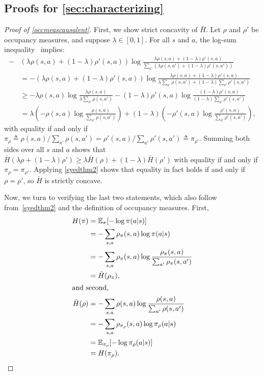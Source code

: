 \documentclass{article}
\newcommand\bbE{\ensuremath{\mathbb{E}}} %
\newcommand{\1}{\mathbb{I}} %
\begin{document}
\subsection{\texorpdfstring{Proofs for \cref{sec:characterizing}}{Proofs for Section 3}} \label{sec:proofs1}
\begin{proof}[Proof of \cref{occmeascausalent}]

First, we show strict concavity of $\bar H$. Let $\rho$ and $\rho'$ be occupancy measures, and suppose $\lambda \in [0,1]$. For all $s$ and $a$, the log-sum inequality~\citep{cover2012elements} implies:
\begin{align}
  - &(\lambda \rho(s,a) + (1-\lambda)\rho'(s,a) )\log \frac{\lambda \rho(s,a) + (1-\lambda)\rho'(s,a) }{\sum_{a'}(\lambda \rho(s,a') + (1-\lambda)\rho'(s,a') )} \\
 &= -(\lambda \rho(s,a) + (1-\lambda)\rho'(s,a) )\log \frac{\lambda \rho(s,a) + (1-\lambda)\rho'(s,a) }{\lambda \sum_{a'}\rho(s,a') + (1-\lambda)\sum_{a'}\rho'(s,a')} \\
 &\geq -\lambda \rho(s,a)\log\frac{\lambda\rho(s,a)}{\lambda\sum_{a'}\rho(s,a')} - (1-\lambda)\rho'(s,a)\log\frac{(1-\lambda)\rho'(s,a)}{(1-\lambda)\sum_{a'}\rho'(s,a')} \\
 &= \lambda \left(-\rho(s,a)\log\frac{\rho(s,a)}{\sum_{a'}\rho(s,a')}\right) + (1-\lambda)\left(-\rho'(s,a)\log\frac{\rho'(s,a)}{\sum_{a'}\rho'(s,a')}\right),
 \end{align}
 with equality if and only if $\pi_\rho \triangleq \rho(s,a)/\sum_{a'}\rho(s,a') = \rho'(s,a)/\sum_{a'}\rho'(s,a') \triangleq \pi_{\rho'}$.
Summing both sides over all $s$ and $a$ shows that $\bar H(\lambda\rho + (1-\lambda)\rho') \geq \lambda \bar H(\rho) + (1-\lambda)\bar H(\rho')$ with equality if and only if $\pi_\rho = \pi_{\rho'}$. Applying \cref{syedthm2} shows that equality in fact holds if and only if $\rho = \rho'$, so $\bar H$ is strictly concave.

Now, we turn to verifying the last two statements, which also follow from~\cref{syedthm2} and the definition of occupancy measures. First,
\begin{align}
H(\pi) &= \bbE_{\pi}[-\log \pi(a|s)] \\
&= -\sum_{s,a}\rho_\pi(s,a) \log \pi(a|s) \\
&= -\sum_{s,a}\rho_\pi(s,a) \log\frac{\rho_\pi(s,a)}{\sum_{a'}\rho_\pi(s,a')} \\
&= \bar H(\rho_\pi), \\
\intertext{and second,}
\bar H(\rho) &= -\sum_{s,a}\rho(s,a)\log\frac{\rho(s,a)}{\sum_{a'}\rho(s,a')} \\
&= -\sum_{s,a}\rho_{\pi_\rho}(s,a)\log \pi_\rho(a|s) \\
&= \bbE_{\pi_\rho}[-\log \pi_\rho(a|s)] \\ &
= H(\pi_\rho).
\end{align}
\end{proof}
\end{document}
